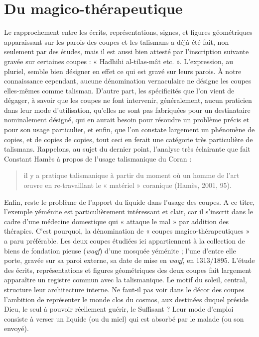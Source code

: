 \section{Du magico-thérapeutique}
Le rapprochement entre les écrits, représentations, signes, et figures géométriques apparaissant sur les parois des coupes et les talismans a 
déjà été fait, non seulement par des études, mais il est aussi bien attesté par l'inscription suivante gravée sur certaines coupes : « Hadhihi al-tilas-mât etc. ». L'expression, au pluriel, semble bien désigner en effet ce qui est gravé sur leurs parois.
À notre connaissance cependant, aucune dénomination vernaculaire ne désigne les coupes elles-mêmes comme talisman. D'autre part, les spécificités que l'on vient de dégager, à savoir que les coupes ne font intervenir, généralement, aucun praticien dans leur mode d'utilisation, qu'elles ne sont pas fabriquées pour un destinataire nominalement désigné, qui en aurait besoin pour résoudre un problème précis et pour son usage particulier, et enfin, que l'on constate largement un phénomène de copies, et de copies de copies, tout ceci en ferait une catégorie très particulière de talismans. Rappelons, au sujet du dernier point, l'analyse très éclairante que fait Constant Hamès à propos de l'usage talismanique du Coran : 
\begin{quote}
    il y a pratique talismanique à partir du moment où un homme de l'art œuvre en re-travaillant le « matériel » coranique (Hamès, 2001, 95).
\end{quote}
Enfin, reste le problème de l'apport du liquide dans l'usage des coupes. A ce titre, l'exemple yéménite est particulièrement intéressant et clair, car il s'inscrit dans le cadre d'une médecine domestique qui « attaque le mal » par addition des thérapies. C'est pourquoi, la dénomination de « coupes magico-thérapeutiques » a paru préférable. 
Les deux coupes étudiées ici appartiennent à la collection de biens de fondation pieuse (\textit{waqf}) d'une mosquée yéménite ; l'une d'entre elle porte, gravée sur sa paroi externe, sa date de mise en \textit{waqf}, en 1313/1895.
L'étude des écrits, représentations et figures géométriques des deux coupes fait largement apparaître un registre commun avec la talismanique. Le motif du soleil, central, structure leur architecture interne. Ne faut-il pas voir dans le décor des coupes l'ambition de représenter le monde clos du cosmos, aux destinées duquel préside Dieu, le seul à pouvoir réellement guérir, le Suffisant ? Leur mode d'emploi consiste à verser un liquide (ou du miel) qui est absorbé par le malade (ou son envoyé).
